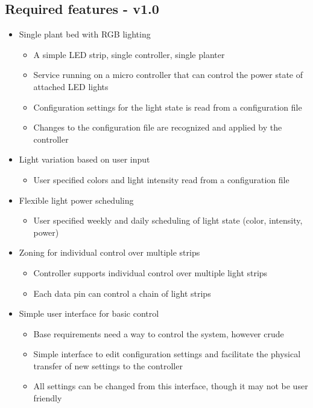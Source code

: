 \documentclass[onecolumn, draftclsnofoot,10pt, compsoc]{IEEEtran}
\begin{document}
	\subsection*{Required features - v1.0}
	\begin{itemize}
		\item Single plant bed with RGB lighting
		\begin{itemize}
			\item A simple LED strip, single controller, single planter
			\item Service running on a micro controller that can control the power state of attached LED lights
			\item Configuration settings for the light state is read from a configuration file
			\item Changes to the configuration file are recognized and applied by the controller
		\end{itemize}
		\item Light variation based on user input
			\begin{itemize}
				\item User specified colors and light intensity read from a configuration file
			\end{itemize}
		\item Flexible light power scheduling
			\begin{itemize}
				\item User specified weekly and daily scheduling of light state (color, intensity, power)
			\end{itemize}
		\item Zoning for individual control over multiple strips
			\begin{itemize}
				\item Controller supports individual control over multiple light strips
				\item Each data pin can control a chain of light strips
			\end{itemize}
		\item Simple user interface for basic control
			\begin{itemize}
				\item Base requirements need a way to control the system, however crude
				\item Simple interface to edit configuration settings and facilitate the physical transfer of new settings to the controller
				\item All settings can be changed from this interface, though it may not be user friendly
			\end{itemize}
	\end{itemize}
\end{document}
